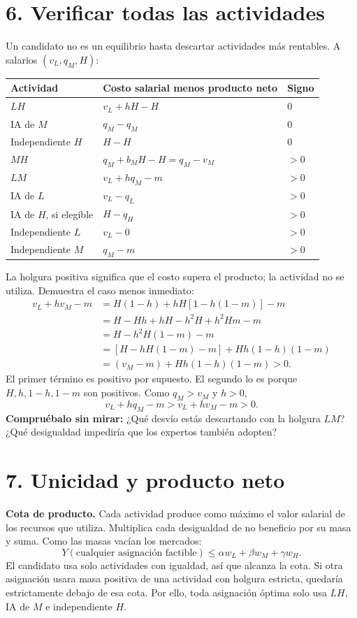\documentclass[11pt]{article}
\newcommand{\pregunta}[1]{\medskip\textbf{Compruébalo sin mirar:} #1\par}
\begin{document}
\section*{6. Verificar todas las actividades}
Un candidato no es un equilibrio hasta descartar actividades más rentables. A salarios $(v_L,q_M,H)$:
\begin{center}\begin{tabular}{lll}\toprule
Actividad & Costo salarial menos producto neto & Signo\\\midrule
$LH$ & $v_L+hH-H$ & $0$\\
IA de $M$ & $q_M-q_M$ & $0$\\
Independiente $H$ & $H-H$ & $0$\\
$MH$ & $q_M+b_MH-H=q_M-v_M$ & $>0$\\
$LM$ & $v_L+hq_M-m$ & $>0$\\
IA de $L$ & $v_L-q_L$ & $>0$\\
IA de $H$, si elegible & $H-q_H$ & $>0$\\
Independiente $L$ & $v_L-0$ & $>0$\\
Independiente $M$ & $q_M-m$ & $>0$\\\bottomrule
\end{tabular}\end{center}
La holgura positiva significa que el costo supera el producto; la actividad no se utiliza. Demuestra el caso menos inmediato:
\begin{align*}
v_L+hv_M-m
&=H(1-h)+hH[1-h(1-m)]-m\\
&=H-Hh+hH-h^2H+h^2Hm-m\\
&=H-h^2H(1-m)-m\\
&=[H-hH(1-m)-m]+Hh(1-h)(1-m)\\
&=(v_M-m)+Hh(1-h)(1-m)>0.
\end{align*}
El primer término es positivo por supuesto. El segundo lo es porque $H,h,1-h,1-m$ son positivos. Como $q_M>v_M$ y $h>0$,
\[
v_L+hq_M-m>v_L+hv_M-m>0.
\]
\pregunta{¿Qué desvío estás descartando con la holgura $LM$? ¿Qué desigualdad impediría que los expertos también adopten?}
\newpage
\section*{7. Unicidad y producto neto}
\textbf{Cota de producto.} Cada actividad produce como máximo el valor salarial de los recursos que utiliza. Multiplica cada desigualdad de no beneficio por su masa y suma. Como las masas vacían los mercados:
\[
Y(\text{cualquier asignación factible})\leq\alpha w_L+\beta w_M+\gamma w_H.
\]
El candidato usa solo actividades con igualdad, así que alcanza la cota. Si otra asignación usara masa positiva de una actividad con holgura estricta, quedaría estrictamente debajo de esa cota. Por ello, toda asignación óptima solo usa $LH$, IA de $M$ e independiente $H$.
\end{document}
